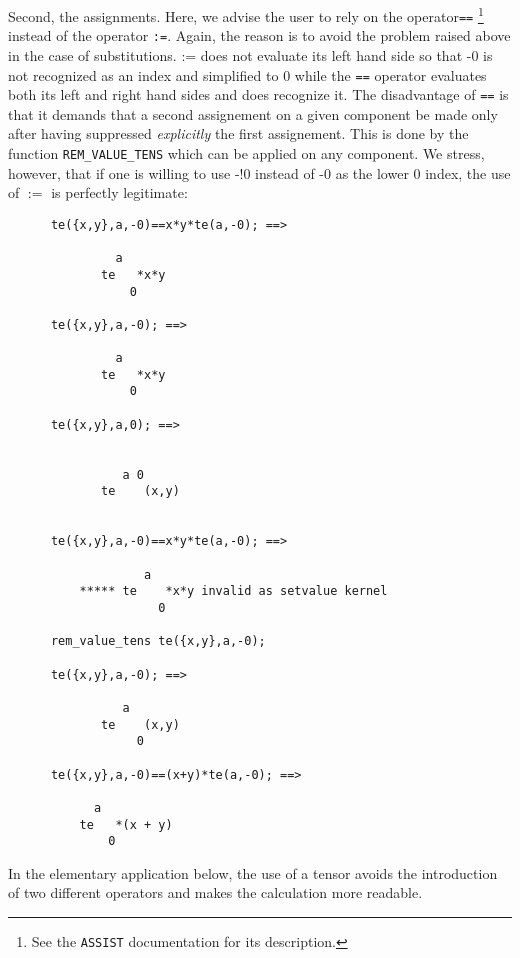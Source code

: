Second, the assignments. Here, we advise the user to rely on  the 
operator\texttt{==}%
%
\footnote{See the \texttt{ASSIST} documentation for its description.} 
instead of the operator \texttt{:=}. Again, 
the reason is to avoid the problem raised above  in the case of 
substitutions. {:=} does not evaluate its left hand side so that -0 is 
not recognized as an index and simplified to 0 while the \texttt{==} operator
evaluates both 
its left and right hand sides and does recognize it.
The disadvantage of \texttt{==} is that it  demands that a second assignement 
on a given component 
 be made only after having suppressed \emph{explicitly} the first assignement.
This is done by the function \texttt{REM\_VALUE\_TENS} 
which can be applied on any component. We stress, however, that if one 
is willing to use -!0 instead of -0 as the lower 0 index, the use of $:=$
is perfectly legitimate:
\begin{verbatim}
      te({x,y},a,-0)==x*y*te(a,-0); ==>

               a
             te   *x*y
                 0

      te({x,y},a,-0); ==>

               a
             te   *x*y
                 0

      te({x,y},a,0); ==>

  
                a 0
             te    (x,y)


      te({x,y},a,-0)==x*y*te(a,-0); ==>

                   a
          ***** te    *x*y invalid as setvalue kernel
                     0

      rem_value_tens te({x,y},a,-0);

      te({x,y},a,-0); ==>

                a
             te    (x,y)
                  0

      te({x,y},a,-0)==(x+y)*te(a,-0); ==>

            a
          te   *(x + y)
              0
\end{verbatim}
In the elementary application below, the use of a tensor avoids the 
introduction of two different operators and  makes the 
calculation  more readable.  

